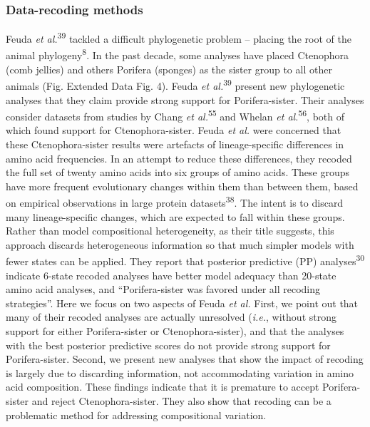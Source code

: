 \documentclass[]{article}
\begin{document}
\hypertarget{data-recoding-methods}{%
\subsubsection{Data-recoding methods}\label{data-recoding-methods}}

Feuda \emph{et al.}\textsuperscript{39} tackled a difficult phylogenetic
problem -- placing the root of the animal phylogeny\textsuperscript{8}.
In the past decade, some analyses have placed Ctenophora (comb jellies)
and others Porifera (sponges) as the sister group to all other animals
(Fig. Extended Data Fig. 4). Feuda \emph{et al.}\textsuperscript{39}
present new phylogenetic analyses that they claim provide strong support
for Porifera-sister. Their analyses consider datasets from studies by
Chang \emph{et al.}\textsuperscript{55} and Whelan \emph{et
al.}\textsuperscript{56}, both of which found support for
Ctenophora-sister. Feuda \emph{et al.} were concerned that these
Ctenophora-sister results were artefacts of lineage-specific differences
in amino acid frequencies. In an attempt to reduce these differences,
they recoded the full set of twenty amino acids into six groups of amino
acids. These groups have more frequent evolutionary changes within them
than between them, based on empirical observations in large protein
datasets\textsuperscript{38}. The intent is to discard many
lineage-specific changes, which are expected to fall within these
groups. Rather than model compositional heterogeneity, as their title
suggests, this approach discards heterogeneous information so that much
simpler models with fewer states can be applied. They report that
posterior predictive (PP) analyses\textsuperscript{30} indicate 6-state
recoded analyses have better model adequacy than 20-state amino acid
analyses, and ``Porifera-sister was favored under all recoding
strategies''. Here we focus on two aspects of Feuda \emph{et al.} First,
we point out that many of their recoded analyses are actually unresolved
(\emph{i.e.}, without strong support for either Porifera-sister or
Ctenophora-sister), and that the analyses with the best posterior
predictive scores do not provide strong support for Porifera-sister.
Second, we present new analyses that show the impact of recoding is
largely due to discarding information, not accommodating variation in
amino acid composition. These findings indicate that it is premature to
accept Porifera-sister and reject Ctenophora-sister. They also show that
recoding can be a problematic method for addressing compositional
variation.
\end{document}

